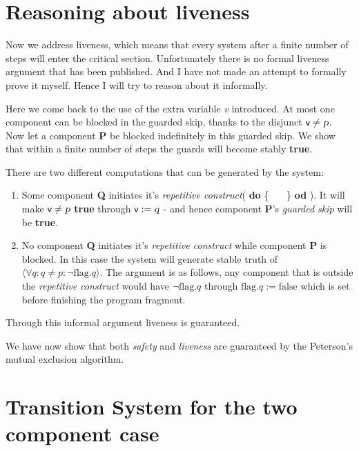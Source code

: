 \documentclass[18pt]{extarticle}
\begin{document}
\section*{Reasoning about liveness}

Now we address liveness, which means that every system after a finite number of steps will enter the critical section. Unfortunately there is no formal liveness argument that has been published.\cite[p.~277]{fg99} And I have not made an attempt to formally prove it myself. Hence I will try to reason about it informally. \newline

Here we come back to the use of the extra variable \textsl{v} introduced. At most one component can be blocked in the guarded skip, thanks to the disjunct $\textsf{v} \neq \textsl{p}$.  Now let a component \textbf{P} be blocked indefinitely in this guarded skip. We show that within a finite number of steps the guards will become stably \textbf{true}.  \newline

There are two different computations that can be generated by the system:
\begin{enumerate}
\item Some component \textbf{Q} initiates it's \textit{repetitive construct}( \textbf{do} \{ \ \ \ \} \textbf{od} ). It will make $\textsf{v} \neq \textsl{p}$ \textbf{true} through $\textsf{v} := \textsl{q}$ - and hence component \textbf{P}'s \textit{guarded skip} will be \textbf{true}.
\item No component \textbf{Q} initiates it's \textit{repetitive construct} while component \textbf{P} is blocked. In this case the system will generate stable truth of $ \langle \forall q: q \neq p: \neg \text{flag}.q \rangle$. The argument is as follows, any component that is outside the \textit{repetitive construct} would have $\neg \text{flag}.q$ through $\text{flag}.q := \text{false}$ which is set  before finishing the program fragment.
\end{enumerate}

Through this informal argument liveness is guaranteed. \newline

We have now show that both \textit{safety} and \textit{liveness} are guaranteed by the Peterson's mutual exclusion algorithm.\newpage

\section*{Transition System for the two component case}
\end{document}
